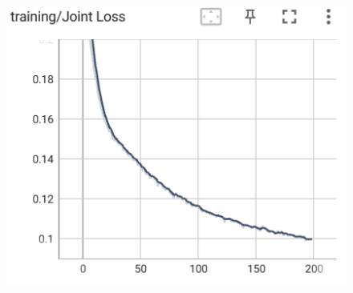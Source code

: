 \documentclass[12pt]{article}
\begin{document}
\begin{enumerate}
\begin{figure}[htbp]
\begin{minipage}{0.4\linewidth}
		\centering
		\includegraphics[width=0.9\linewidth]{./figs/shared_joint_loss_99_1.png}
		\label{pic three}%
	\end{minipage}
    \end{figure}


\end{enumerate}
\end{document}
